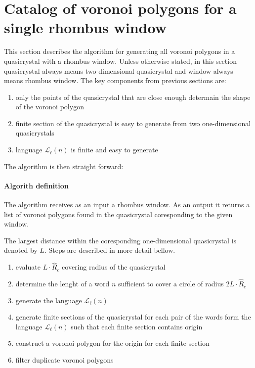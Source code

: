 \documentclass[text.tex]{subfiles}
\begin{document}
\section{Catalog of voronoi polygons for a single rhombus window}
This section describes the algorithm for generating all voronoi polygons in a quasicrystal with a rhombus window. Unless otherwise stated, in this section quasicrystal always means two-dimensional quasicrystal and window always means rhombus window. The key components from previous sections are:

\begin{enumerate}
\item only the points of the quasicrystal that are close enough determain the shape of the voronoi polygon
\item finite section of the quasicrystal is easy to generate from two one-dimensional quasicrystals
\item language $\mathcal{L}_{\ell}(n)$ is finite and easy to generate
\end{enumerate}

The algorithm is then straight forward:

\paragraph{Algorith definition} The algorithm receives as an input a rhombus window. As an output it returns a list of voronoi polygons found in the quasicrystal coresponding to the given window.

The largest distance within the coresponding one-dimensional quasicrystal is denoted by $L$. Steps are described in more detail bellow.

\begin{enumerate}
\item evaluate $L\cdot\hat{R}_c$ covering radius of the quasicrystal
\item determine the lenght of a word $n$ sufficient to cover a circle of radius $2L\cdot\hat{R}_c$
\item generate the language $\mathcal{L}_{\ell}(n)$
\item generate finite sections of the quasicrystal for each pair of the words form the language $\mathcal{L}_{\ell}(n)$ such that each finite section contains origin
\item construct a voronoi polygon for the origin for each finite section
\item filter duplicate voronoi polygons
\end{enumerate}
\end{document}
